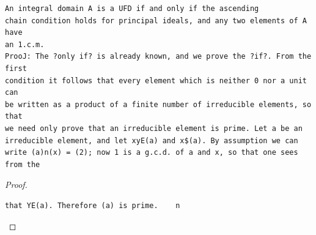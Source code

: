 \begin{theorem}\label{mcrt-auto-theorem-20-5}\uses{}
\begin{verbatim}
An integral domain A is a UFD if and only if the ascending
chain condition holds for principal ideals, and any two elements of A have
an 1.c.m.
ProoJ: The ?only if? is already known, and we prove the ?if?. From the first
condition it follows that every element which is neither 0 nor a unit can
be written as a product of a finite number of irreducible elements, so that
we need only prove that an irreducible element is prime. Let a be an
irreducible element, and let xyE(a) and x$(a). By assumption we can
write (a)n(x) = (2); now 1 is a g.c.d. of a and x, so that one sees from the
\end{verbatim}
\end{theorem}
\begin{proof}
\begin{verbatim}
that YE(a). Therefore (a) is prime.    n
\end{verbatim}
\end{proof}


